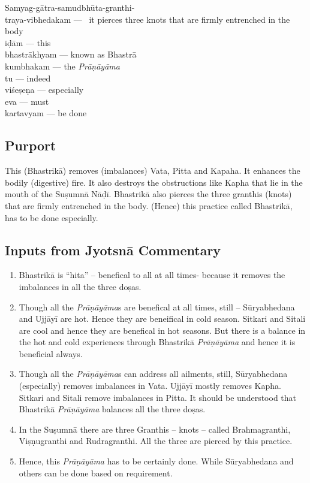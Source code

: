 \begin{multicols}{2}
Samyag-gātra-samudbhūta-granthi-\\
traya-vibhedakam ---  it  pierces three knots that are firmly entrenched  in the body\\
iḍām  --- this \\
bhastrākhyam --- known as Bhastrā\\
kumbhakam --- the \textit{Prāṇāyāma} \\
tu --- indeed \\
viśeṣeṇa --- especially \\
eva --- must \\
kartavyam --- be done
\end{multicols}

\subsection*{Purport}


This (Bhastrikā) removes (imbalances) Vata, Pitta and Kapaha. It enhances the bodily (digestive) fire. It also destroys the obstructions like Kapha that lie in the mouth of the Suṣumnā Nāḍī. Bhastrikā also pierces the three granthis (knots) that are firmly entrenched in the body. (Hence) this practice called Bhastrikā, has to be done especially.

\subsection*{Inputs from Jyotsnā Commentary}


\begin{enumerate}
\item Bhastrikā is “hita” – benefical to all at all times- because it removes the imbalances in all the three doṣas. 
\item Though all the \textit{Prāṇāyāma}s are benefical at all times, still – Sūryabhedana and Ujjāyī are hot. Hence they are beneifical in cold season. Sitkari and Sitali are cool and hence they are benefical in hot seasons.  But there is a balance in the hot and cold experiences through Bhastrikā \textit{Prāṇāyāma} and hence it is beneficial always. 
\item Though all the \textit{Prāṇāyāma}s can address all ailments, still, Sūryabhedana (especially) removes imbalances in Vata. Ujjāyī mostly removes Kapha. Sitkari and Sitali remove imbalances in Pitta. It should be understood that Bhastrikā \textit{Prāṇāyāma} balances all the three doṣas.  
\item In the Suṣumnā there are three Granthis – knots – called Brahmagranthi, Viṣṇugranthi and Rudragranthi.  All the three are pierced by this practice. 
\item Hence, this \textit{Prāṇāyāma} has to be certainly done. While Sūryabhedana and others can be done based on requirement.
\end{enumerate}
\newpage
    
